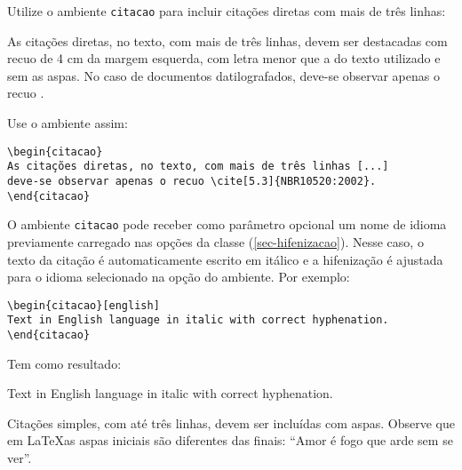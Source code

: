 Utilize o ambiente \texttt{citacao} para incluir citações diretas com mais de três linhas:

\begin{citacao}
As citações diretas, no texto, com mais de três linhas, devem ser
destacadas com recuo de 4 cm da margem esquerda, com letra menor que a do texto utilizado e sem as aspas. No caso de documentos datilografados, deve-se observar apenas o recuo \cite[5.3]{NBR10520:2002}.
\end{citacao}

Use o ambiente assim:

\begin{verbatim}
\begin{citacao}
As citações diretas, no texto, com mais de três linhas [...] 
deve-se observar apenas o recuo \cite[5.3]{NBR10520:2002}.
\end{citacao}
\end{verbatim}

O ambiente \texttt{citacao} pode receber como parâmetro opcional um nome de
idioma previamente carregado nas opções da classe (\autoref{sec-hifenizacao}). Nesse
caso, o texto da citação é automaticamente escrito em itálico e a hifenização é
ajustada para o idioma selecionado na opção do ambiente. Por exemplo:

\begin{verbatim}
\begin{citacao}[english]
Text in English language in italic with correct hyphenation.
\end{citacao}
\end{verbatim}

Tem como resultado:

\begin{citacao}[english]
Text in English language in italic with correct hyphenation.
\end{citacao}

Citações simples, com até três linhas, devem ser
incluídas com aspas. Observe que em \LaTeX as aspas iniciais são diferentes das
finais: ``Amor é fogo que arde sem se ver''.
